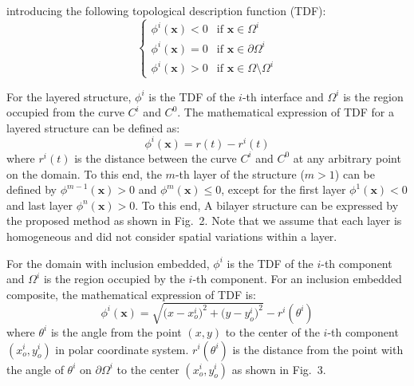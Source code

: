 \documentclass[11pt]{article}
\begin{document}
\noindent
introducing the following topological description function (TDF):
\begin{equation}
\begin{cases}
\phi^i(\mathbf{x}) < 0 & \text{if } \mathbf{x} \in \Omega^i \\
\phi^i(\mathbf{x}) = 0 & \text{if } \mathbf{x} \in \partial\Omega^i \\
\phi^i(\mathbf{x}) > 0 & \text{if } \mathbf{x} \in \Omega \setminus \Omega^i
\end{cases}
\end{equation}

For the layered structure, $\phi^i$ is the TDF of the $i$-th
interface and $\Omega^i$ is the region occupied from the curve $C^i$
and $C^0$. The mathematical expression of TDF for a layered structure
can be defined as:
\begin{equation}
\phi^i(\mathbf{x}) = r(t) - r^i(t)
\end{equation}
where $r^i(t)$ is the distance between the curve $C^i$ and $C^0$ at
any arbitrary point on the domain. To this end, the $m$-th layer of
the structure ($m > 1$) can be defined by $\phi^{m-1}(\mathbf{x}) > 0$
and $\phi^{m}(\mathbf{x}) \leq 0$, except for the first layer
$\phi^{1}(\mathbf{x}) < 0$ and last layer $\phi^{n}(\mathbf{x}) > 0$.
To this end, A bilayer structure can be expressed by the proposed
method as shown in Fig.~2. Note that we assume that each layer is
homogeneous and did not consider spatial variations within a layer.

For the domain with inclusion embedded, $\phi^i$ is the TDF of the
$i$-th component and $\Omega^i$ is the region occupied by the $i$-th
component. For an inclusion embedded composite, the mathematical
expression of TDF is:
\begin{equation}
\phi^i(\mathbf{x}) = \sqrt{\bigl(x - x_o^i\bigr)^{2}
                           + \bigl(y - y_o^i\bigr)^{2}}
                     - r^i\!\left(\theta^i\right)
\end{equation}
where $\theta^i$ is the angle from the point $(x, y)$ to the center
of the $i$-th component $\left(x_o^i, y_o^i\right)$ in polar
coordinate system. $r^i(\theta^i)$ is the distance from the point
with the angle of $\theta^i$ on $\partial\Omega^i$ to the center
$\left(x_o^i, y_o^i\right)$ as shown in Fig.~3.
\end{document}
